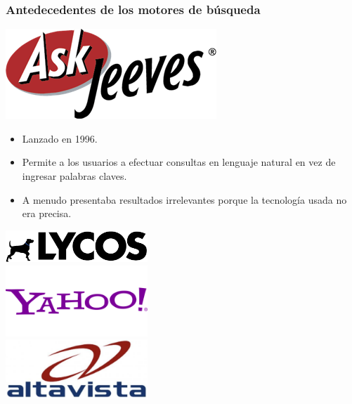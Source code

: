 \documentclass[
10pt, %
aspectratio=169, %
]{beamer}
\begin{document}
	\begin{frame}
		
		\frametitle{Antedecedentes de los motores de búsqueda}
		
		\begin{minipage}[c]{0.6\textwidth}
			\includegraphics[width=\textwidth]{ask.png}
			
			\vspace{2\baselineskip}
			
			\begin{itemize}
				\item Lanzado en 1996.
				\item Permite a los usuarios a efectuar consultas en lenguaje natural en vez de ingresar palabras claves. 
				\item A menudo presentaba resultados irrelevantes porque la tecnología usada no era precisa.
			\end{itemize}
			
		\end{minipage}%
		\hfill
		\begin{minipage}[c]{0.3\textwidth}
			\centering
			\includegraphics[width=0.4\textwidth]{Lycos.png}\\[1ex]
			\includegraphics[width=0.4\textwidth]{yahoo.png}\\[1ex]
			\includegraphics[width=0.4\textwidth]{altavista.png}
		\end{minipage}
		
	\end{frame}
	
\end{document}

